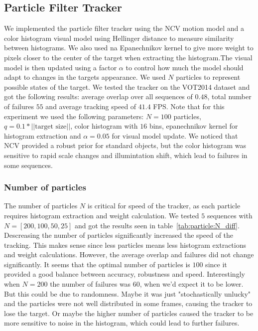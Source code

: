 \documentclass[9pt]{IEEEtran}
\begin{document}
\subsection{Particle Filter Tracker}
We implemented the particle filter tracker using the NCV motion model and a color histogram visual model using Hellinger
distance to measure similarity between histograms. We also used na Epanechnikov kernel to give more weight
to pixels closer to the center of the target when extracting the histogram.The visual model is then updated using
a factor $\alpha$ to control how much the model should adapt to changes in the targets appearance.
We used $N$ particles to represent possible states of the 
target. We tested the tracker on the VOT2014 dataset
and got the following results: average overlap over all sequences of $0.48$, total number of failures
$55$ and average tracking speed of $41.4$ FPS. Note that for this experiment we used the following parameters:
$N = 100$ particles, $q = 0.1 * ||\text{target size}||$, color histogram with $16$ bins,
epanechnikov kernel for histogram extraction and $\alpha = 0.05$ for visual model update. We noticed that NCV provided a robust prior for standard objects, but the color histogram was sensitive to 
rapid scale changes and illumintation shift, which lead to failures in some sequences.

\subsubsection{Number of particles}
The number of particles $N$ is critical for speed of the tracker, as each particle requires histogram extraction
and weight calculation. We tested $5$ sequences with $N = [200,100,50,25]$ and got the results seen in 
table~\ref{tab:particle:N_diff}. Descreasing the number of particles significantly increased the speed of the tracking. This
makes sense since less particles means less histogram extractions and weight calculations. However, the average overlap
and failures did not change significantly. It seems that the optimal number of particles is $100$ since it provided
a good balance between accuracy, robustness and speed. Interestingly when $N=200$ the number of failures was $60$, when
we'd expect it to be lower. But this could be due to randomness. Maybe it was just "stochastically unlucky" and the
particles were not well distributed in some frames, causing the tracker to lose the target. Or maybe
the higher number of particles caused the tracker to be more sensitive to noise in the histogram, which could lead to further failures.
\end{document}
